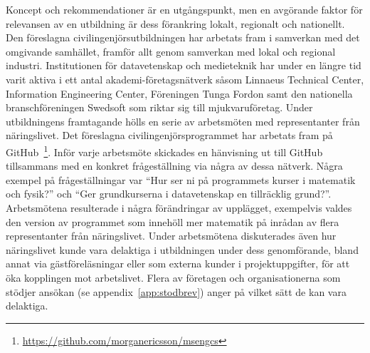 Koncept och rekommendationer är en utgångspunkt, men en avgörande faktor för relevansen av en utbildning är dess förankring lokalt, regionalt och nationellt. Den föreslagna civilingenjörsutbildningen har arbetats fram i samverkan med det omgivande samhället, framför allt genom samverkan med lokal och regional industri. Institutionen för datavetenskap och medieteknik har under en längre tid varit aktiva i ett antal akademi-företagsnätverk såsom Linnaeus Technical Center, Information Engineering Center, Föreningen Tunga Fordon samt den nationella branschföreningen Swedsoft som riktar sig till mjukvaruföretag. Under utbildningens framtagande hölls en serie av arbetsmöten med representanter från näringslivet. Det föreslagna civilingenjörsprogrammet har arbetats fram på GitHub~\footnote{\url{https://github.com/morganericsson/msengcs}}. Inför varje arbetsmöte skickades en hänvisning ut till GitHub tillsammans med en konkret frågeställning via några av dessa nätverk. Några exempel på frågeställningar var ``Hur ser ni på programmets kurser i matematik och fysik?'' och ``Ger grundkurserna i datavetenskap en tillräcklig grund?''. Arbetsmötena resulterade i några förändringar av upplägget, exempelvis valdes den version av programmet som innehöll mer matematik på inrådan av flera representanter från näringslivet. Under arbetsmötena diskuterades även hur näringslivet kunde vara delaktiga i utbildningen under dess genomförande, bland annat via gästföreläsningar eller som externa kunder i projektuppgifter, för att öka kopplingen mot arbetslivet. Flera av företagen och organisationerna som stödjer ansökan (se appendix~\ref{app:stodbrev}) anger på vilket sätt de kan vara delaktiga.

